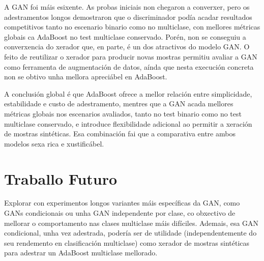 \documentclass[12pt,a4paper]{article}
\begin{document}
A GAN foi máis esixente. As probas iniciais non chegaron a converxer, pero os adestramentos longos demostraron que o discriminador podía acadar resultados
competitivos tanto no escenario binario como no multiclase, con mellores métricas globais ca AdaBoost no test multiclase conservado.
Porén, non se conseguiu a converxencia do xerador que, en parte, é un dos atractivos do modelo GAN.
O feito de reutilizar o xerador para producir novas mostras permitiu
avaliar a GAN como ferramenta de augmentación de datos, aínda que nesta
execución concreta non se obtivo unha mellora apreciábel en AdaBoost.

A conclusión global é que AdaBoost ofrece a mellor relación entre
simplicidade, estabilidade e custo de adestramento, mentres que a GAN acada
mellores métricas globais nos escenarios avaliados, tanto no test binario
como no test multiclase conservado, e introduce flexibilidade adicional ao
permitir a xeración de mostras sintéticas. Esa combinación fai
que a comparativa entre ambos modelos sexa rica e xustificábel.

\section{Traballo Futuro}

Explorar con experimentos longos variantes máis específicas da GAN, como GANs condicionais
    ou unha GAN independente por clase, co obxectivo de mellorar o comportamento
    nas clases multiclase máis difíciles. Ademais, esa GAN condicional, unha vez adestrada,
    podería ser de utilidade (independentemente do seu rendemento en clasificación multiclase)
    como xerador de mostras sintéticas para adestrar un AdaBoost multiclase mellorado.


\newpage



\end{document}
